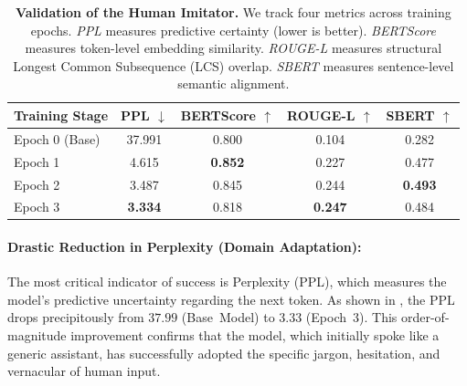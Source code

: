 \begin{table}[ht]
    \centering
    \renewcommand{\arraystretch}{1.2}
    \begin{tabular}{l S[table-format=2.3] S[table-format=1.3] S[table-format=1.3] S[table-format=1.3]}
        \toprule
        \textbf{Training Stage} & \textbf{PPL} $\downarrow$ & \textbf{BERTScore} $\uparrow$ & \textbf{ROUGE-L} $\uparrow$ & \textbf{SBERT} $\uparrow$ \\
        \midrule
        Epoch 0 (Base) & 37.991 & 0.800 & 0.104 & 0.282 \\
        Epoch 1        &  4.615 & \textbf{0.852} & 0.227 & 0.477 \\
        Epoch 2        &  3.487 & 0.845 & 0.244 & \textbf{0.493} \\
        Epoch 3        &  \textbf{3.334} & 0.818 & \textbf{0.247} & 0.484 \\
        \bottomrule
    \end{tabular}
    \caption{\textbf{Validation of the Human Imitator.} We track four metrics across training epochs. \emph{PPL} measures predictive certainty (lower is better). \emph{BERTScore} measures token-level embedding similarity. \emph{ROUGE-L} measures structural Longest Common Subsequence (LCS) overlap. \emph{SBERT} measures sentence-level semantic alignment.}
    \label{tab:sft-eval}
\end{table}

\paragraph{Drastic Reduction in Perplexity (Domain Adaptation):}
The most critical indicator of success is Perplexity (PPL), which measures the model's predictive uncertainty regarding the next token. As shown in , the PPL drops precipitously from $37.99$ (Base~Model) to $3.33$ (Epoch~3). This order-of-magnitude improvement confirms that the model, which initially spoke like a generic assistant, has successfully adopted the specific jargon, hesitation, and vernacular of human input.

